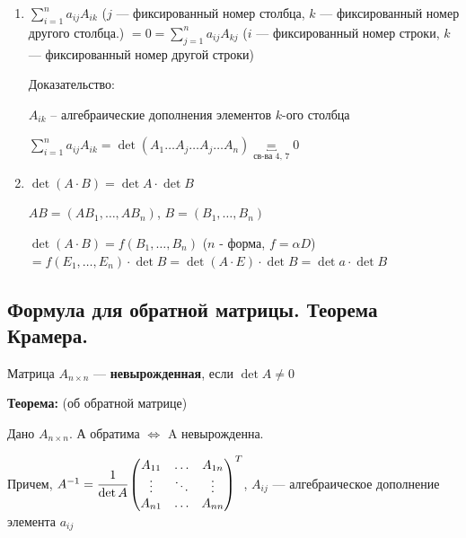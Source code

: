 \begin{enumerate}
          Докажем для произвольного j-ого столбца

          \(\det A = \det (\ldots A_j \ldots) \underbracket{=}_{\text{св-во 4}} (-1)^{j-1} \det (A_j A_1 \ldots A_n) = \sum\limits_{i=1}^n(-1)^{j-1}(-1)^{i+1} a_{ij} M_{ij}\)




    \item \(\sum\limits_{i = 1}^n a_{ij} A_{ik} \) (\(j\) --- фиксированный номер столбца, \(k\) --- фиксированный номер другого столбца.) \( = 0 = \sum\limits_{j = 1}^n a_{ij} A_{kj}\) (\(i\) --- фиксированный номер строки, \(k\) --- фиксированный номер другой строки)


          Доказательство:

          $A_{ik}$ -- алгебраические дополнения элементов $k$-ого столбца

          \( \sum\limits_{i=1}^n a_{ij}A_{ik} = \det (A_1\ldots A_j \ldots A_j\ldots A_n) \underbracket{=}_{\text{св-ва 4, 7}} 0\)
    
    \item \(\det(A \cdot B) = \det A \cdot \det B\)

          \(AB = (AB_1, \ldots, AB_n)\), \(B = (B_1, \ldots, B_n)\)

          \(\det(A \cdot B) = f(B_1, \ldots, B_n)\) (\(n\) - форма, \(f = \alpha D\))
          \(= f(E_1, \ldots, E_n) \cdot \det B = \det(A \cdot E) \cdot \det B = \det a \cdot \det B\)

\end{enumerate}

\subsection{Формула для обратной матрицы. Теорема Крамера.}

Матрица \(A_{n \times n}\) --- \textbf{невырожденная}, если \(\det A \neq 0\)

\textbf{Теорема:} (об обратной матрице)

Дано \(A_{n\times n}\). А обратима $\Leftrightarrow$ A невырожденна.

Причем, \(A^{-1}=\cfrac{1}{\det A}
\begin{pmatrix}
    A_{11} & \ldots & A_{1n} \\
    \vdots & \ddots & \vdots \\
    A_{n1} & \ldots & A_{nn}
\end{pmatrix}^T\), \(A_{ij}\) --- алгебраическое дополнение элемента \(a_{ij}\)


